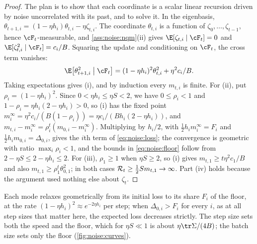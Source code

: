 \begin{refsection}
\begin{proof}
The plan is to show that each coordinate is a scalar linear recursion driven by noise uncorrelated with its past, and to solve it. In the eigenbasis, $\theta_{t+1,i}=(1-\eta h_i)\theta_{t,i}-\eta\zeta_{t,i}$. The coordinate $\theta_{t,i}$ is a function of $\zeta_0,\dots,\zeta_{t-1}$, hence $\cF_t$-measurable, and \cref{ass:noise:nqm}(ii) gives $\E[\zeta_{t,i}\mid\cF_t]=0$ and $\E[\zeta_{t,i}^2\mid\cF_t]=c_i/B$. Squaring the update and conditioning on $\cF_t$, the cross term vanishes:
\[
  \E\bigl[\theta_{t+1,i}^2\bigm|\cF_t\bigr]=(1-\eta h_i)^2\theta_{t,i}^2+\eta^2c_i/B .
\]
Taking expectations gives (i), and by induction every $m_{t,i}$ is finite. For (ii), put $\rho_i=(1-\eta h_i)^2$. Since $0<\eta h_i\le\eta S<2$, we have $0\le\rho_i<1$ and $1-\rho_i=\eta h_i(2-\eta h_i)>0$, so (i) has the fixed point $m_i^\infty=\eta^2c_i/(B(1-\rho_i))=\eta c_i/(Bh_i(2-\eta h_i))$, and $m_{t,i}-m_i^\infty=\rho_i^t(m_{0,i}-m_i^\infty)$. Multiplying by $h_i/2$, with $\frac12h_im_i^\infty=F_i$ and $\frac12h_im_{0,i}=\Delta_{0,i}$, gives the $i$th term of \eqref{eq:noise:loss}; the convergence is geometric with ratio $\max_i\rho_i<1$, and the bounds in \eqref{eq:noise:floor} follow from $2-\eta S\le2-\eta h_i\le2$. For (iii), $\rho_1\ge1$ when $\eta S\ge2$, so (i) gives $m_{t,1}\ge t\eta^2c_1/B$ and also $m_{t,1}\ge\rho_1^t\theta_{0,1}^2$; in both cases $\mathcal{R}_t\ge\frac12Sm_{t,1}\to\infty$. Part (iv) holds because the argument used nothing else about $\zeta_t$.
\end{proof}

Each mode relaxes geometrically from its initial loss to its share $F_i$ of the floor, at the rate $(1-\eta h_i)^2\approx e^{-2\eta h_i}$ per step; when $\Delta_{0,i}>F_i$ for every $i$, as at all step sizes that matter here, the expected loss decreases strictly. The step size sets both the speed and the floor, which for $\eta S\ll1$ is about $\eta\tr\Sigma/(4B)$; the batch size sets only the floor (\cref{fig:noise:curves}).


\end{refsection}
